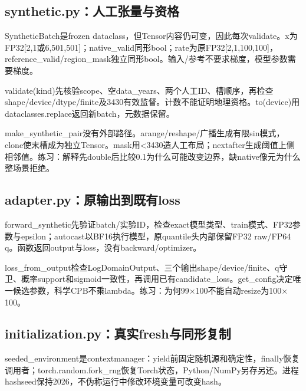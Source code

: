 \documentclass[UTF8,fontset=fandol,10pt]{ctexart}
\begin{document}
\subsection{synthetic.py：人工张量与资格}

SyntheticBatch是frozen dataclass，但Tensor内容仍可变，因此每次validate。x为FP32[2,1或6,501,501]；native\_\allowbreak{}valid同形bool；rate为原FP32[2,1,100,100]，reference\_\allowbreak{}valid/\allowbreak{}region\_\allowbreak{}mask独立同形bool。输入/\allowbreak{}参考不要求梯度，模型参数需要梯度。

validate(kind)先核验scope、空data\_\allowbreak{}years、两个人工ID、槽顺序，再检查shape/\allowbreak{}device/\allowbreak{}dtype/\allowbreak{}finite及3430有效监督。计数不能证明地理资格。to(device)用dataclasses.replace返回新batch，元数据保留。

make\_\allowbreak{}synthetic\_\allowbreak{}pair没有外部路径。arange/\allowbreak{}reshape/\allowbreak{}广播生成有限sin模式，clone使末槽成为独立Tensor。mask用<3430造人工布局；nextafter生成阈值上侧相邻值。练习：解释先double后比较0.1为什么可能改变边界，缺native像元为什么整场景拒绝。

\subsection{adapter.py：原输出到既有loss}

forward\_\allowbreak{}synthetic先验证batch/\allowbreak{}实验ID，检查exact模型类型、train模式、FP32参数与epsilon；autocast以BF16执行模型，原quantile头内部保留FP32 raw/\allowbreak{}FP64 q。函数返回output与loss，没有backward/\allowbreak{}optimizer。

loss\_\allowbreak{}from\_\allowbreak{}output检查LogDomainOutput、三个输出shape/\allowbreak{}device/\allowbreak{}finite、q守卫、概率support和sigmoid一致性，再调用已有candidate\_\allowbreak{}loss。get\_\allowbreak{}config决定唯一候选参数，科学CPB不乘lambda。练习：为何99\(\times\)100不能自动resize为100\(\times\)100。

\subsection{initialization.py：真实fresh与同形复制}

seeded\_\allowbreak{}environment是contextmanager：yield前固定随机源和确定性，finally恢复调用者；torch.random.fork\_\allowbreak{}rng恢复Torch状态，Python/\allowbreak{}NumPy另存另还。进程hashseed保持2026，不伪称运行中修改环境变量可改变hash。
\end{document}
